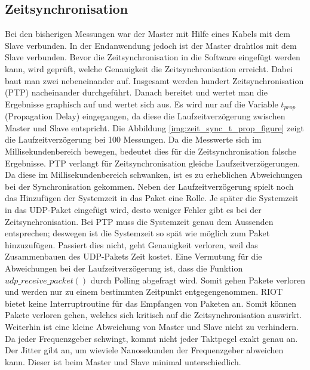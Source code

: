 \subsection{Zeitsynchronisation}
Bei den bisherigen Messungen war der Master mit Hilfe eines Kabels mit dem Slave verbunden. In der Endanwendung jedoch ist der Master drahtlos mit dem Slave verbunden. Bevor die Zeitsynchronisation in die Software eingefügt werden kann, wird geprüft, welche Genauigkeit die Zeitsynchronisation erreicht. Dabei baut man zwei \board \platz nebeneinander auf. Insgesamt werden hundert Zeitsynchronisation (PTP) nacheinander durchgeführt. Danach bereitet und wertet man die Ergebnisse graphisch auf und wertet sich aus. Es wird nur auf die Variable $t_{prop}$ (Propagation Delay) eingegangen, da diese die Laufzeitverzögerung zwischen Master und Slave entspricht. Die Abbildung \ref{img:zeit_sync_t_prop_figure} zeigt die Laufzeitverzögerung bei \si{100} Messungen. Da die Messwerte sich im Millisekundenbereich bewegen, bedeutet dies für die Zeitsynchronisation falsche Ergebnisse. PTP verlangt für Zeitsynchronisation gleiche Laufzeitverzögerungen. Da diese im Millisekundenbereich schwanken, ist es zu erheblichen Abweichungen bei der Synchronisation gekommen. Neben der Laufzeitverzögerung spielt noch das Hinzufügen der Systemzeit in das Paket eine Rolle. Je später die Systemzeit in das UDP-Paket eingefügt wird, desto weniger Fehler gibt es bei der Zeitsynchronisation. Bei PTP muss die Systemzeit genau dem Aussenden entsprechen; deswegen ist die Systemzeit so spät wie möglich zum Paket hinzuzufügen. Passiert dies nicht, geht Genauigkeit verloren, weil das Zusammenbauen des UDP-Pakets Zeit kostet. Eine Vermutung für die Abweichungen bei der Laufzeitverzögerung ist, dass die Funktion $udp\_receive\_packet()$ durch Polling abgefragt wird. Somit gehen Pakete verloren und werden nur zu einem bestimmten Zeitpunkt entgegengenommen. RIOT bietet keine Interruptroutine für das Empfangen von Paketen an. Somit können Pakete verloren gehen, welches sich kritisch auf die Zeitsynchronisation auswirkt. Weiterhin ist eine kleine Abweichung von Master und Slave nicht zu verhindern. Da jeder Frequenzgeber schwingt, kommt nicht jeder Taktpegel exakt genau an. Der Jitter gibt an, um wieviele Nanosekunden der Frequenzgeber abweichen kann. Dieser ist beim Master und Slave minimal unterschiedlich. 

